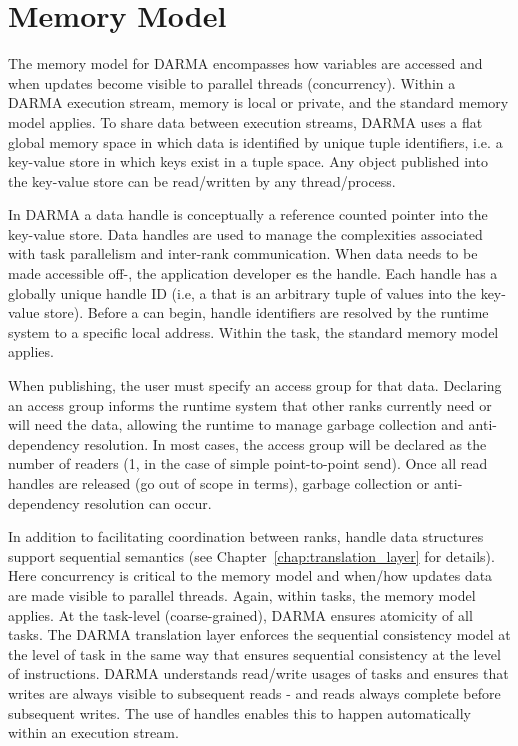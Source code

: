 
\section{Memory Model}
\label{sec:mem_model}
The memory model for \gls{DARMA} encompasses how variables are accessed %
  and when updates become visible to parallel threads (concurrency).  
Within a \gls{DARMA} \gls{execution stream}, memory is local or private, and the
standard \CC{} memory model applies. 
To share data between \glspl{execution stream}, \gls{DARMA} uses a flat global
\gls{memory space} in which data is identified by unique \gls{tuple} identifiers, i.e. a \gls{key-value
  store} in which keys exist in a \gls{tuple space}.
Any object published into the \gls{key-value store} can be read/written by any thread/process. 

In \gls{DARMA} a data \gls{handle} is conceptually a \gls{reference counted pointer} into the
\gls{key-value store}.  Data \glspl{handle} are used to manage the
complexities associated with \gls{task parallelism} and inter-\gls{rank} communication.  
When data needs to be made accessible off-, the application developer 
es the \gls{handle}.  Each \gls{handle} has a globally unique handle ID
(i.e, a  that is an arbitrary \gls{tuple} of values into the
 \gls{key-value store}).  
Before a  can begin, \gls{handle} identifiers are resolved by
the \gls{runtime system} to a specific local address. Within the task, the standard \CC{} memory model applies.

When publishing, the user must specify an \gls{access group} for that data.  
Declaring an \gls{access group} informs the \gls{runtime system} that other
\glspl{rank} currently need or will need the data,  
allowing the runtime to manage \gls{garbage collection} and \gls{anti-dependency} resolution.
In most cases, the \gls{access group} will be declared as the number of readers (1, in the case of simple point-to-point send).
Once all read \glspl{handle} are released (go out of scope in \CC{} terms),
\gls{garbage collection} or \gls{anti-dependency} resolution can occur.


In addition to facilitating coordination between \glspl{rank}, \gls{handle} data
structures support \gls{sequential semantics} (see
Chapter~\ref{chap:translation_layer} for details).
Here concurrency is critical to the \gls{memory model} and when/how updates data
are made visible to parallel threads.
Again, within \glspl{task}, the \CC{} \gls{memory model} applies.
At the \gls{task}-level (coarse-grained), \gls{DARMA} ensures atomicity of all
\glspl{task}.
The \gls{DARMA} translation layer enforces the \CC{} sequential consistency
model at the level of \gls{task} in the same way that \CC{} ensures sequential
consistency at the level of instructions.
\gls{DARMA} understands read/write usages of \glspl{task} and ensures that
writes are always visible to subsequent reads - and reads always complete before
subsequent writes.
The use of \glspl{handle} enables this to happen automatically within an
\gls{execution stream}.




